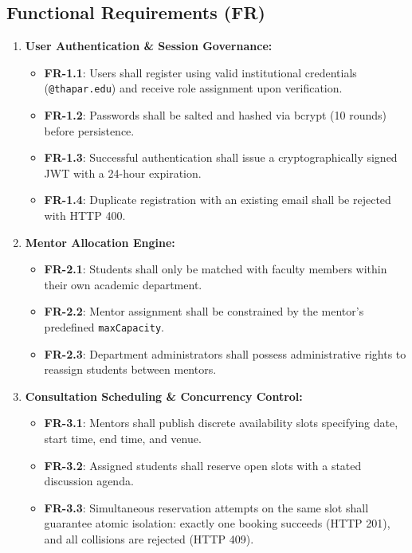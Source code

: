 \documentclass[11pt,a4paper]{article}
\begin{document}
\subsection{Functional Requirements (FR)}
\begin{enumerate}[label=\textbf{FR-\arabic*}, leftmargin=2.5em, itemsep=0.3em]
  \item \textbf{User Authentication \& Session Governance:}
  \begin{itemize}[itemsep=0.1em]
    \item \textbf{FR-1.1}: Users shall register using valid institutional credentials (\texttt{@thapar.edu}) and receive role assignment upon verification.
    \item \textbf{FR-1.2}: Passwords shall be salted and hashed via bcrypt (10 rounds) before persistence.
    \item \textbf{FR-1.3}: Successful authentication shall issue a cryptographically signed JWT with a 24-hour expiration.
    \item \textbf{FR-1.4}: Duplicate registration with an existing email shall be rejected with HTTP 400.
  \end{itemize}
  \item \textbf{Mentor Allocation Engine:}
  \begin{itemize}[itemsep=0.1em]
    \item \textbf{FR-2.1}: Students shall only be matched with faculty members within their own academic department.
    \item \textbf{FR-2.2}: Mentor assignment shall be constrained by the mentor's predefined \texttt{maxCapacity}.
    \item \textbf{FR-2.3}: Department administrators shall possess administrative rights to reassign students between mentors.
  \end{itemize}
  \item \textbf{Consultation Scheduling \& Concurrency Control:}
  \begin{itemize}[itemsep=0.1em]
    \item \textbf{FR-3.1}: Mentors shall publish discrete availability slots specifying date, start time, end time, and venue.
    \item \textbf{FR-3.2}: Assigned students shall reserve open slots with a stated discussion agenda.
    \item \textbf{FR-3.3}: Simultaneous reservation attempts on the same slot shall guarantee atomic isolation: exactly one booking succeeds (HTTP 201), and all collisions are rejected (HTTP 409).

\end{itemize}
\end{enumerate}
\end{document}
